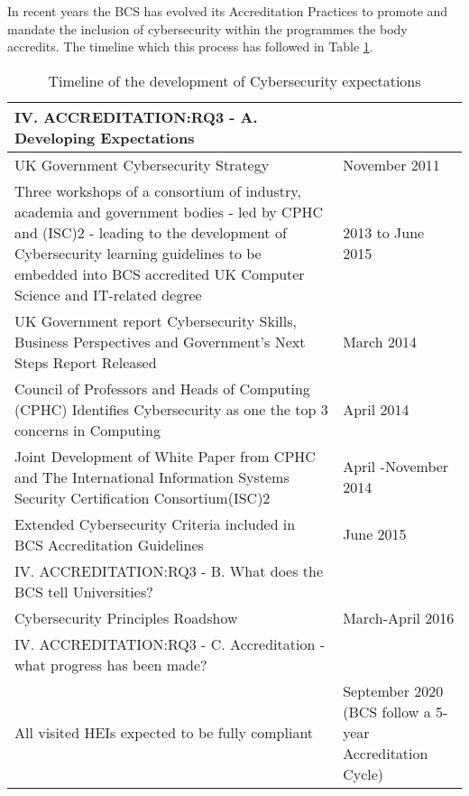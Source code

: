 \documentclass[conference]{IEEEtran}
\begin{document}
In recent years the BCS has evolved its Accreditation Practices to promote and mandate the inclusion of cybersecurity within the programmes the body accredits. The timeline which this process has followed in Table \ref{table:1}.
\begin{center}
  \begin{table}[h!]
  \begin{tabular}{ | p{6cm} |p{1.5cm} |}
    \hline
    IV. ACCREDITATION:RQ3 - A. Developing Expectations &   \\ \hline
    UK Government Cybersecurity Strategy \cite{UKCabinetOffice} & November 2011 \\ \hline
    Three workshops of a consortium of industry, academia and government bodies - led by CPHC and (ISC)2 - leading to the development of Cybersecurity learning guidelines to be embedded into BCS accredited UK Computer Science and IT-related degree \cite{CPHCISC2}  & 2013 to June 2015 \\ \hline
    UK Government report Cybersecurity Skills, Business Perspectives and Government's Next Steps Report Released \cite{UKCabinetOffice2014} & March 2014  \\ \hline
    Council of Professors and Heads of Computing (CPHC) Identifies Cybersecurity as one the top 3 concerns in Computing & April 2014 \\ \hline
    Joint Development of White Paper from CPHC and The International Information Systems Security Certification Consortium(ISC)2 \cite{CPHCISC2014} & April -November 2014 \\ \hline
    Extended Cybersecurity Criteria included in BCS Accreditation Guidelines \cite{BCS2018a}& June 2015 \\
    \hline
    IV. ACCREDITATION:RQ3 - B. What does the BCS tell Universities? & \\ \hline
    Cybersecurity Principles Roadshow & March-April 2016 \\ \hline
    IV. ACCREDITATION:RQ3 - C. Accreditation - what progress has been made? &  \\ \hline
    All visited HEIs expected to be fully compliant & September 2020 (BCS follow a 5-year Accreditation Cycle)  \\ \hline
  \end{tabular}
  \caption{Timeline of the development of Cybersecurity expectations}
  \label{table:1}
  \end{table}
\end{center}
\end{document}
